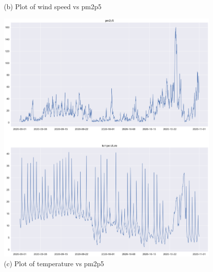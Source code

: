 \documentclass{article}
\begin{document}
\begin{figure}[h!]
\begin{minipage}[t]{0.4\textwidth}
      \caption{(b) Plot of wind speed vs pm2p5 }
    \end{minipage}
  \end{figure}
  
  \begin{figure}[h!]
    \centering
    \begin{minipage}[t]{0.4\textwidth}
      \centering
      \includegraphics[scale=0.18]{plottemperature.png}
      \caption{(c) Plot of temperature vs pm2p5}
    \end{minipage}\hfill
    \begin{minipage}[t]{0.4\textwidth}
      \centering

\end{minipage}
\end{figure}
\end{document}
